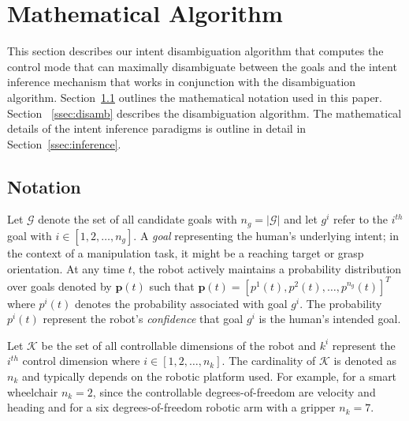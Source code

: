 \section{Mathematical Algorithm}\label{sec:ma}
This section describes our intent disambiguation algorithm that computes the control mode that can maximally disambiguate between the goals and the intent inference mechanism that works in conjunction with the disambiguation algorithm. Section~\ref{ssec:notation} outlines the mathematical notation used in this paper. Section ~\ref{ssec:disamb} describes the disambiguation algorithm. The mathematical details of the intent inference paradigms is outline in detail in Section~\ref{ssec:inference}.
\subsection{Notation}\label{ssec:notation}
Let $\mathcal{G}$ denote the set of all candidate goals with $n_g = \vert\mathcal{G}\vert$ and let $g^i$ refer to the $i^{th}$ goal with $i \in [1,2,\dots, n_g]$. A \textit{goal} representing the human's underlying intent; in the context of a manipulation task, it might be a reaching target or grasp orientation. At any time $t$, the robot actively maintains a probability distribution over goals denoted by $\boldsymbol{p}(t)$ such that $\boldsymbol{p}(t) = [p^1(t), p^2(t),\dots, p^{n_g}(t)]^{T}$ where $p^i(t)$ denotes the probability associated with goal $g^i$.  The probability $p^i(t)$ represent the robot's \textit{confidence} that goal $g^i$ is the human's intended goal. 

Let $\mathcal{K}$ be the set of all controllable dimensions of the robot and $k^i$ represent the $i^{th}$ control dimension where $i \in [1,2,\dots,n_k]$. The cardinality of $\mathcal{K}$ is denoted as $n_k$ and typically depends on the robotic platform used. For example, for a smart wheelchair $n_k = 2$, since the controllable degrees-of-freedom are velocity and heading and for a six degrees-of-freedom robotic arm with a gripper $n_k = 7$. 

